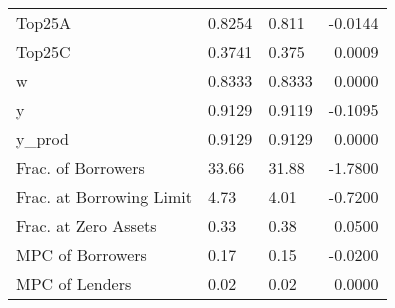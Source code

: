 \begin{table}
\begin{tabular}{lllr}
                  Top25A &  0.8254 &    0.811 & -0.0144 \\
                  Top25C &  0.3741 &    0.375 &  0.0009 \\
                       w &  0.8333 &   0.8333 &  0.0000 \\
                       y &  0.9129 &   0.9119 & -0.1095 \\
                  y\_prod &  0.9129 &   0.9129 &  0.0000 \\
      Frac. of Borrowers &   33.66 &    31.88 & -1.7800 \\
Frac. at Borrowing Limit &    4.73 &     4.01 & -0.7200 \\
    Frac. at Zero Assets &    0.33 &     0.38 &  0.0500 \\
        MPC of Borrowers &    0.17 &     0.15 & -0.0200 \\
          MPC of Lenders &    0.02 &     0.02 &  0.0000 \\
\bottomrule
\end{tabular}
\end{table}
